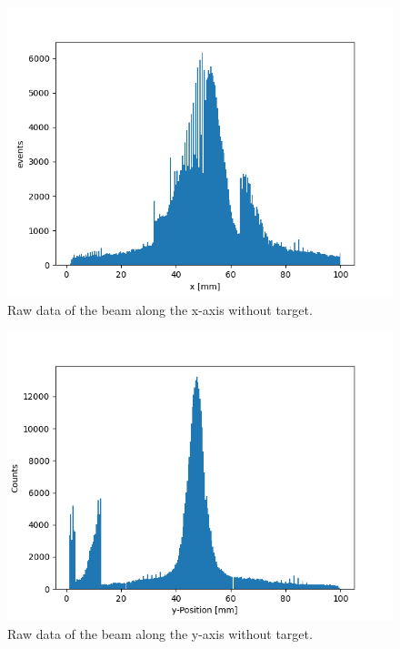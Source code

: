 \documentclass[t,9pt]{beamer}
\begin{document}
        \begin{frame}
                \vfill
                \begin{figure}
                        \centering
                        \includegraphics[width=.8\textwidth]{../src/elsa/finished_plots/UnfilteredNoMaterialX.png}
                        \caption{Raw data of the beam along the x-axis without target.}
                \end{figure}
        \end{frame}

        \begin{frame}
                \vfill
                \begin{figure}
                        \centering
                        \includegraphics[width=.8\textwidth]{../src/elsa/finished_plots/unfiltered_noMaterial.png}
                        \caption{Raw data of the beam along the y-axis without target.}
                \end{figure}
        \end{frame}
\end{document}
